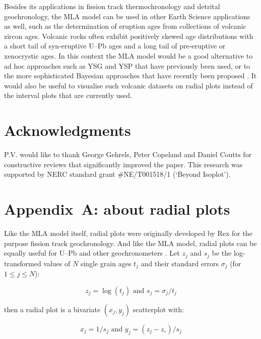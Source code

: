 \documentclass{article}
\begin{document}
Besides its applications in fission track thermochronology and
detrital geochronology, the MLA model can be used in other Earth
Science applications as well, such as the determination of eruption
ages from collections of volcanic zircon ages. Volcanic rocks often
exhibit positively skewed age distributions with a short tail of
syn-eruptive U--Pb ages and a long tail of pre-eruptive or xenocrystic
ages. In this context the MLA model would be a good alternative to ad
hoc approaches such as YSG and YSP that have previously been used, or
to the more sophisticated Bayesian approaches that have recently been
proposed \citep{keller2018}. It would also be useful to visualise such
volcanic datasets on radial plots instead of the interval plots that
are currently used.

\section{Acknowledgments}

P.V. would like to thank George Gehrels, Peter Copeland and Daniel
Coutts for constructive reviews that significantly improved the
paper. This research was supported by NERC standard grant
\#NE/T001518/1 (`Beyond Isoplot').

\section*{Appendix~A: about radial plots}

Like the MLA model itself, radial plots were originally developed by
Rex \citet{galbraith1988,galbraith2005} for the purpose fission track
geochronology. And like the MLA model, radial plots can be equally
useful for U--Pb and other geochronometers
\citep{vermeesch2009c,vermeesch2018c}. Let $z_j$ and $s_j$ be the
log-transformed values of $N$ single grain ages $t_j$ and their
standard errors $\sigma_j$ (for $1 \leq j \leq N$):

\begin{equation}
  z_j = \log(t_j) \mbox{~and~} s_j = \sigma_j/t_j
\end{equation}

\noindent then a radial plot is a bivariate $(x_j,y_j)$ scatterplot
with:

\begin{equation}
  x_j = 1/s_j \mbox{~and~} y_j = (z_j - z_\circ)/s_j
\end{equation}
\end{document}
